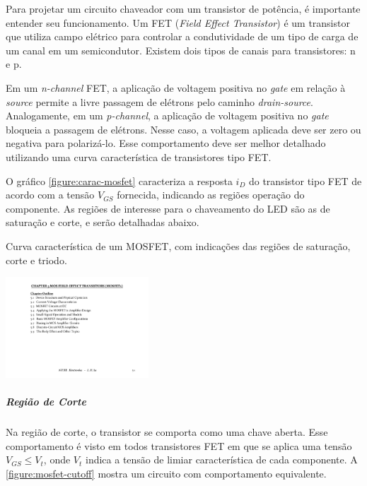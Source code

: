 	Para projetar um circuito chaveador com um transistor de potência, é importante entender seu funcionamento. Um FET (\emph{Field Effect Transistor}) é um transistor que utiliza campo elétrico para controlar a condutividade de um tipo de carga de um canal em um semicondutor. Existem dois tipos de canais para transistores: n e p.

	Em um \textit{n-channel} FET, a aplicação de voltagem positiva no \textit{gate} em relação à \textit{source} permite a livre passagem de elétrons pelo caminho \textit{drain-source}. Analogamente, em um \textit{p-channel}, a aplicação de voltagem positiva no \textit{gate} bloqueia a passagem de elétrons. Nesse caso, a voltagem aplicada deve ser zero ou negativa para polarizá-lo. Esse comportamento deve ser melhor detalhado utilizando uma curva característica de transistores tipo FET.

	O gráfico \ref{figure:carac-mosfet} caracteriza a resposta $i_{D}$ do transistor tipo FET de acordo com a tensão $V_{GS}$ fornecida, indicando as regiões operação do componente. As regiões de interesse para o chaveamento do LED são as de saturação e corte, e serão detalhadas abaixo.

	\begin{chart}[h]
		\caption{\label{figure:carac-mosfet}Curva característica de um MOSFET, com indicações das regiões de saturação, corte e triodo.}
		\centering
		\includegraphics[page=8,width=0.4\textwidth, trim={16.5cm 9.89cm 3.6cm 3cm},clip]{circuits/Electronics_Ch5.pdf}
	\end{chart}

	\subparagraph{Região de Corte}
	Na região de corte, o transistor se comporta como uma chave aberta. Esse comportamento é visto em todos transistores FET em que se aplica uma tensão $V_{GS} \leq V_{t}$, onde $V_{t}$ indica a tensão de limiar  característica de cada componente. A \autoref{figure:mosfet-cutoff} mostra um circuito com comportamento equivalente.

